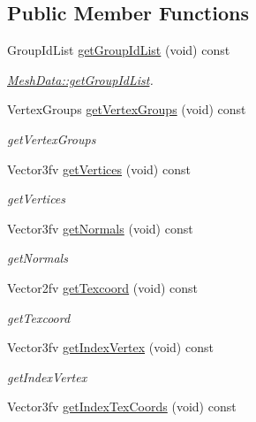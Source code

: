 \subsection*{Public Member Functions}
\begin{DoxyCompactItemize}
\item 
Group\+Id\+List \hyperlink{classEngine_1_1MeshData_a5e1b9108ca9e19e5a981fec9cd8a351f}{get\+Group\+Id\+List} (void) const 
\begin{DoxyCompactList}\small\item\em \hyperlink{classEngine_1_1MeshData_a5e1b9108ca9e19e5a981fec9cd8a351f}{Mesh\+Data\+::get\+Group\+Id\+List}. \end{DoxyCompactList}\item 
Vertex\+Groups \hyperlink{classEngine_1_1MeshData_a29232cd601a0480433f23b9faf2a1fa3}{get\+Vertex\+Groups} (void) const 
\begin{DoxyCompactList}\small\item\em get\+Vertex\+Groups \end{DoxyCompactList}\item 
Vector3fv \hyperlink{classEngine_1_1MeshData_a2f24a9508fec6c078f8dff74a64b3566}{get\+Vertices} (void) const 
\begin{DoxyCompactList}\small\item\em get\+Vertices \end{DoxyCompactList}\item 
Vector3fv \hyperlink{classEngine_1_1MeshData_aab08fdc17ec7f531cd6a5c006ac7b607}{get\+Normals} (void) const 
\begin{DoxyCompactList}\small\item\em get\+Normals \end{DoxyCompactList}\item 
Vector2fv \hyperlink{classEngine_1_1MeshData_a8c8c11d0c12e2fafdddbe05efc6057f3}{get\+Texcoord} (void) const 
\begin{DoxyCompactList}\small\item\em get\+Texcoord \end{DoxyCompactList}\item 
Vector3fv \hyperlink{classEngine_1_1MeshData_af8a7aceef507044cf0fa7b385df27d14}{get\+Index\+Vertex} (void) const 
\begin{DoxyCompactList}\small\item\em get\+Index\+Vertex \end{DoxyCompactList}\item 
Vector3fv \hyperlink{classEngine_1_1MeshData_af59825e8b56b0858d33132b0b2032e26}{get\+Index\+Tex\+Coords} (void) const 

\end{DoxyCompactItemize}
